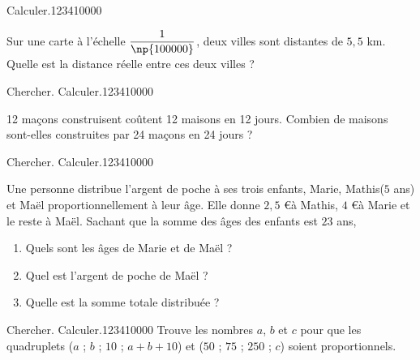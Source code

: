 \begin{pageParcourst}

\begin{ExoCt}{Calculer.}{1234}{1}{0}{0}{0}{0}

Sur une carte à l'échelle $\dfrac{1}{\np{100000}}$, deux villes sont distantes de $5,5$ km. Quelle est la distance réelle entre ces deux villes ?

\end{ExoCt}


\begin{ExoCt}{Chercher. Calculer.}{1234}{1}{0}{0}{0}{0}
 
  12 maçons construisent coûtent 12 maisons en 12 jours. Combien de maisons sont-elles construites par 24 maçons en 24 jours ?

\end{ExoCt}


\begin{ExoCt}{Chercher. Calculer.}{1234}{1}{0}{0}{0}{0}
 
Une personne distribue l'argent de poche à ses trois enfants, Marie, Mathis($5$ ans) et Maël 
proportionnellement à leur âge. Elle donne $2,5$ \euro à Mathis, $4$ \euro  à Marie et le reste à Maël. 
Sachant que la somme des âges des enfants est $23$ ans, 
\begin{enumerate}[leftmargin=*]
\item Quels sont les âges de Marie et de Maël ? 
\item Quel est l'argent de poche de Maël ? 
\item Quelle est la somme totale distribuée ?
\end{enumerate}

\end{ExoCt}

 \begin{ExoCt}{Chercher. Calculer.}{1234}{1}{0}{0}{0}{0}
Trouve les nombres $a$, $b$ et $c$ pour que les quadruplets ($a$ ; $b$ ; $10$ ; $a+b+10$) et ($50$ ; $75$ ; $250$ ; $c$) soient proportionnels.

\end{ExoCt}


\end{pageParcourst}

